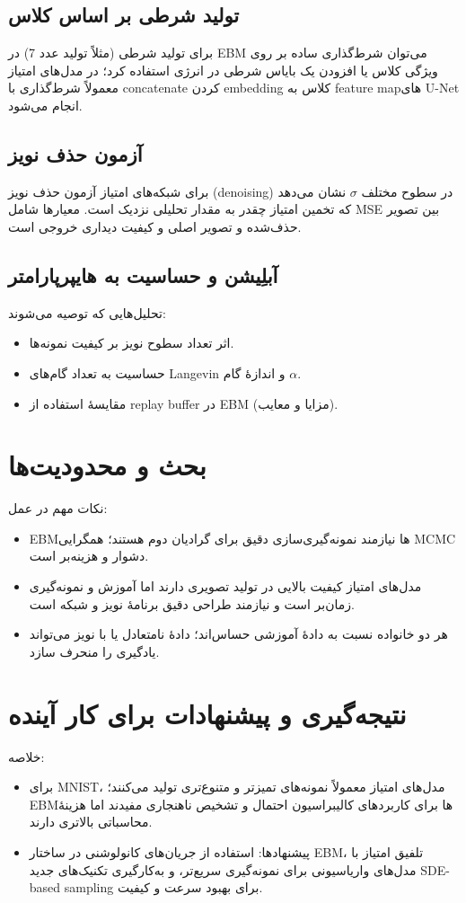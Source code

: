 \subsection{تولید شرطی بر اساس کلاس}
برای تولید شرطی (مثلاً تولید عدد 7) در EBM می‌توان شرط‌گذاری ساده بر روی ویژگی کلاس یا افزودن یک بایاس شرطی در انرژی استفاده کرد؛ در مدل‌های امتیاز معمولاً شرط‌گذاری با concatenate کردن embedding کلاس به feature mapهای U-Net انجام می‌شود.

\subsection{آزمون حذف نویز}
برای شبکه‌های امتیاز آزمون حذف نویز (denoising) در سطوح مختلف \(\sigma\) نشان می‌دهد که تخمین امتیاز چقدر به مقدار تحلیلی نزدیک است. معیارها شامل MSE بین تصویر حذف‌شده و تصویر اصلی و کیفیت دیداری خروجی است.

\subsection{آبلِیشن و حساسیت به هایپرپارامتر}
تحلیل‌هایی که توصیه می‌شوند:
\begin{itemize}
    \item اثر تعداد سطوح نویز بر کیفیت نمونه‌ها.
    \item حساسیت به تعداد گام‌های Langevin و اندازهٔ گام \(\alpha\).
    \item مقایسهٔ استفاده از replay buffer در EBM (مزایا و معایب).
\end{itemize}

\section{بحث و محدودیت‌ها}
نکات مهم در عمل:
\begin{itemize}
    \item EBMها نیازمند نمونه‌گیری‌سازی دقیق برای گرادیان دوم هستند؛ همگرایی MCMC دشوار و هزینه‌بر است.
    \item مدل‌های امتیاز کیفیت بالایی در تولید تصویری دارند اما آموزش و نمونه‌گیری زمان‌بر است و نیازمند طراحی دقیق برنامهٔ نویز و شبکه است.
    \item هر دو خانواده نسبت به دادهٔ آموزشی حساس‌اند؛ دادهٔ نامتعادل یا با نویز می‌تواند یادگیری را منحرف سازد.
\end{itemize}

\section{نتیجه‌گیری و پیشنهادات برای کار آینده}
خلاصه:
\begin{itemize}
    \item برای MNIST، مدل‌های امتیاز معمولاً نمونه‌های تمیزتر و متنوع‌تری تولید می‌کنند؛ EBMها برای کاربردهای کالیبراسیون احتمال و تشخیص ناهنجاری مفیدند اما هزینهٔ محاسباتی بالاتری دارند.
    \item پیشنهادها: استفاده از جریان‌های کانولوشنی در ساختار EBM، تلفیق امتیاز با مدل‌های واریاسیونی برای نمونه‌گیری سریع‌تر، و به‌کارگیری تکنیک‌های جدید SDE-based sampling برای بهبود سرعت و کیفیت.
\end{itemize}

